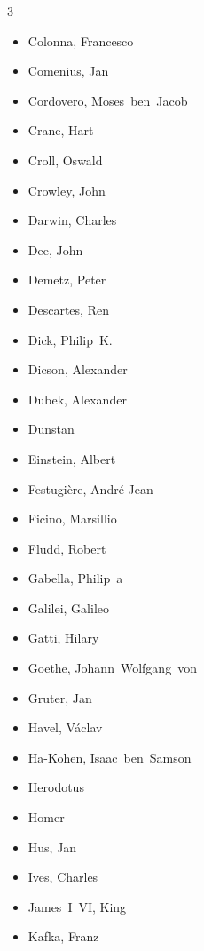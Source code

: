 \documentclass[10pt,makeidx]{extreport}
\begin{document}
\begin{multicols}{3}
\begin{itemize}
		\item Colonna, Francesco
		\item Comenius, Jan
		\item Cordovero, Moses~ben~Jacob
		\item Crane, Hart
		\item Croll, Oswald
		\item Crowley, John
		\item Darwin, Charles
		\item Dee, John
		\item Demetz, Peter
		\item Descartes, Ren
		\item Dick, Philip~K.
		\item Dicson, Alexander
		\item Dubek, Alexander
		\item Dunstan
		\item Einstein, Albert
		\item Festugière, André-Jean
		\item Ficino, Marsillio
		\item Fludd, Robert
		\item Gabella, Philip~a
		\item Galilei, Galileo
		\item Gatti, Hilary
		\item Goethe, Johann~Wolfgang~von
		\item Gruter, Jan
		\item Havel, Václav
		\item Ha-Kohen, Isaac~ben~Samson
		\item Herodotus
		\item Homer
		\item Hus, Jan
		\item Ives, Charles
		\item James~I~VI, King
		\item Kafka, Franz

\end{itemize}
\end{multicols}
\end{document}
